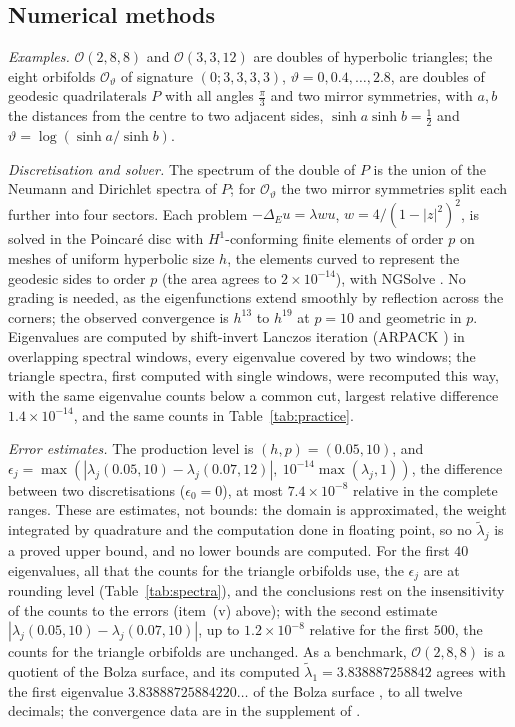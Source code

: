 \documentclass[pdflatex,sn-mathphys-num]{sn-jnl}
\theoremstyle{thmstyleone}%
\theoremstyle{thmstylethree}%
\newcommand{\Orb}{\mathcal{O}}
\begin{document}
\subsection{Numerical methods}\label{sec:numerical}

\emph{Examples.} $\Orb(2,8,8)$ and $\Orb(3,3,12)$ are doubles of hyperbolic triangles; the eight orbifolds $\Orb_\vartheta$ of signature $(0;3,3,3,3)$, $\vartheta=0,0.4,\dots,2.8$, are doubles of geodesic quadrilaterals $P$ with all angles $\frac\pi3$ and two mirror symmetries, with $a,b$ the distances from the centre to two adjacent sides, $\sinh a\sinh b=\frac12$ and $\vartheta=\log(\sinh a/\sinh b)$.

\emph{Discretisation and solver.} The spectrum of the double of $P$ is the union of the Neumann and Dirichlet spectra of $P$; for $\Orb_\vartheta$ the two mirror symmetries split each further into four sectors. Each problem $-\Delta_Eu=\lambda wu$, $w=4/(1-|z|^2)^2$, is solved in the Poincar\'e disc with $H^1$-conforming finite elements of order $p$ on meshes of uniform hyperbolic size $h$, the elements curved to represent the geodesic sides to order $p$ (the area agrees to $2\times10^{-14}$), with NGSolve \cite{ngsolve,schoberl1997}. No grading is needed, as the eigenfunctions extend smoothly by reflection across the corners; the observed convergence is $h^{13}$ to $h^{19}$ at $p=10$ and geometric in $p$. Eigenvalues are computed by shift-invert Lanczos iteration (ARPACK \cite{arpack1998}) in overlapping spectral windows, every eigenvalue covered by two windows; the triangle spectra, first computed with single windows, were recomputed this way, with the same eigenvalue counts below a common cut, largest relative difference $1.4\times10^{-14}$, and the same counts in Table~\ref{tab:practice}.

\emph{Error estimates.} The production level is $(h,p)=(0.05,10)$, and $\epsilon_j=\max(|\lambda_j(0.05,10)-\lambda_j(0.07,12)|,\ 10^{-14}\max(\lambda_j,1))$, the difference between two discretisations ($\epsilon_0=0$), at most $7.4\times10^{-8}$ relative in the complete ranges. These are estimates, not bounds: the domain is approximated, the weight integrated by quadrature and the computation done in floating point, so no $\tilde\lambda_j$ is a proved upper bound, and no lower bounds are computed. For the first $40$ eigenvalues, all that the counts for the triangle orbifolds use, the $\epsilon_j$ are at rounding level (Table~\ref{tab:spectra}), and the conclusions rest on the insensitivity of the counts to the errors (item~(v) above); with the second estimate $|\lambda_j(0.05,10)-\lambda_j(0.07,10)|$, up to $1.2\times10^{-8}$ relative for the first $500$, the counts for the triangle orbifolds are unchanged. As a benchmark, $\Orb(2,8,8)$ is a quotient of the Bolza surface, and its computed $\tilde\lambda_1=3.838887258842$ agrees with the first eigenvalue $3.83888725884220\ldots$ of the Bolza surface \cite{strohmaieruski2013}, \cite{kmp2024} to all twelve decimals; the convergence data are in the supplement of \cite{companionA}.
\end{document}
